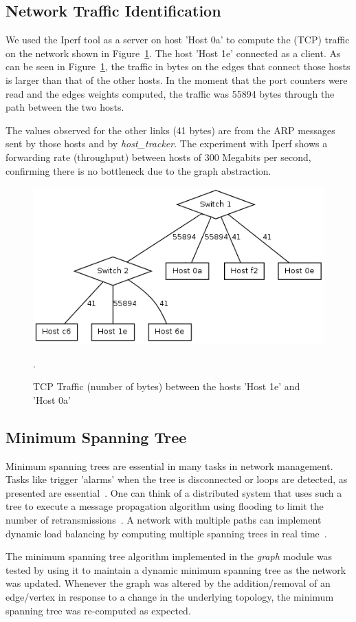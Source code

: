 \subsection{Network Traffic Identification}

We used the Iperf tool as a server on host 'Host 0a' 
to compute the (TCP) traffic on the network shown in Figure~\ref{fig:iperf}.
The host 'Host 1e' connected as a client.
As can be seen in Figure~\ref{fig:iperf}, the traffic 
in bytes on the edges that connect those hosts is larger than that of 
the other hosts.
In the moment that the port counters were read and the 
edges weights computed, the traffic was 55894 bytes through the path 
between the two hosts.

The values observed for the other links (41 bytes) are from the ARP
messages sent by those hosts and 
by \emph{host\_tracker}.
The experiment with Iperf shows a forwarding rate (throughput) 
between hosts of 300 Megabits per second, confirming there is no bottleneck
due to the graph abstraction.

\begin{figure}[htb!]
    \centering
    \includegraphics[width=1.0\columnwidth]{img/graph_iperf.png}
    \caption{TCP Traffic (number of bytes) between the hosts 'Host 1e' and 'Host 0a'}.
    \label{fig:iperf}
\end{figure}

\subsection{Minimum Spanning Tree}

Minimum spanning trees are essential in many tasks in network management.
Tasks like trigger 'alarms' when the tree is disconnected or 
loops are detected, as presented are essential~\cite{schmid2013exploiting}.
One can think of a distributed system that uses such a tree to 
execute a message propagation algorithm using flooding to limit the
number of retransmissions~\cite{Monsanto:2013:CSN:2482626.2482629}.
A network with multiple paths can implement dynamic load balancing by
computing multiple spanning trees in real time~\cite{spain}.

The minimum spanning tree algorithm implemented in the \emph{graph} module
was tested by using it to maintain
a dynamic minimum spanning tree as the network was updated.
Whenever the graph was altered by the addition/removal of an edge/vertex in
response to a change in the underlying topology, the minimum spanning tree
was re-computed as expected.
